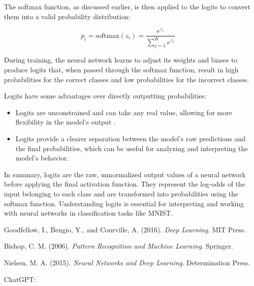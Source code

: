 The softmax function, as discussed earlier, is then applied to the logits to convert them into a valid probability distribution:

\begin{equation}
p_i = \text{softmax}(z_i) = \frac{e^{z_i}}{\sum_{j=1}^{K} e^{z_j}}
\end{equation}

During training, the neural network learns to adjust its weights and biases to produce logits that, when passed through the softmax function, result in high probabilities for the correct classes and low probabilities for the incorrect classes.

Logits have some advantages over directly outputting probabilities:

\begin{itemize}
  \item Logits are unconstrained and can take any real value, allowing for more flexibility in the model's output \cite{nielsen2015neural}.
  \item Logits provide a clearer separation between the model's raw predictions and the final probabilities, which can be useful for analyzing and interpreting the model's behavior.
\end{itemize}

In summary, logits are the raw, unnormalized output values of a neural network before applying the final activation function. They represent the log-odds of the input belonging to each class and are transformed into probabilities using the softmax function. Understanding logits is essential for interpreting and working with neural networks in classification tasks like MNIST.

\begin{thebibliography}{9}
  Goodfellow, I., Bengio, Y., and Courville, A. (2016).
  \textit{Deep Learning}.
  MIT Press.

  Bishop, C. M. (2006).
  \textit{Pattern Recognition and Machine Learning}.
  Springer.

  Nielsen, M. A. (2015).
  \textit{Neural Networks and Deep Learning}.
  Determination Press.
\end{thebibliography}

ChatGPT:

